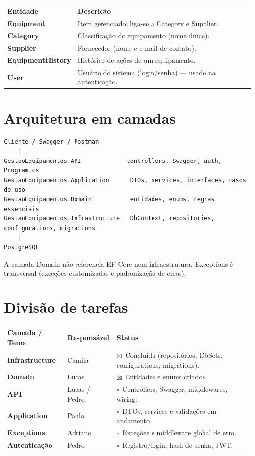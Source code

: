 \documentclass[11pt,a4paper]{article}
\newcommand{\headrow}[1]{\rowcolor{boxbg}#1}
\newcommand{\done}{{\color{headgray}$\boxtimes$}}
\newcommand{\todo}{{\color{accent}$\square$}}
\begin{document}
\begin{tabularx}{\textwidth}{@{}l Y@{}}
\toprule
\headrow{\textbf{Entidade} & \textbf{Descrição}} \\
\midrule
\textbf{Equipment} & Item gerenciado; liga-se a Category e Supplier. \\
\textbf{Category} & Classificação do equipamento (nome único). \\
\textbf{Supplier} & Fornecedor (nome e e-mail de contato). \\
\textbf{EquipmentHistory} & Histórico de ações de um equipamento. \\
\textbf{User} & Usuário do sistema (login/senha) --- usado na autenticação. \\
\bottomrule
\end{tabularx}

\section{Arquitetura em camadas}

\begin{Verbatim}[frame=single, framerule=0.5pt, rulecolor=\color{rulegray}, fontsize=\footnotesize]
Cliente / Swagger / Postman
    |
GestaoEquipamentos.API             controllers, Swagger, auth, Program.cs
GestaoEquipamentos.Application      DTOs, services, interfaces, casos de uso
GestaoEquipamentos.Domain           entidades, enums, regras essenciais
GestaoEquipamentos.Infrastructure   DbContext, repositories, configurations, migrations
    |
PostgreSQL
\end{Verbatim}

A camada Domain não referencia EF Core nem infraestrutura. Exceptions é transversal
(exceções customizadas e padronização de erros).

\section{Divisão de tarefas}

\begin{tabularx}{\textwidth}{@{}l l Y@{}}
\toprule
\headrow{\textbf{Camada / Tema} & \textbf{Responsável} & \textbf{Status}} \\
\midrule
\textbf{Infrastructure} & Camila & \done\ Concluída (repositórios, DbSets, configurations, migrations). \\
\textbf{Domain} & Lucas & \done\ Entidades e enums criados. \\
\textbf{API} & Lucas / Pedro & \todo\ Controllers, Swagger, middlewares, wiring. \\
\textbf{Application} & Paulo & \todo\ DTOs, services e validações em andamento. \\
\textbf{Exceptions} & Adriano & \todo\ Exceções e middleware global de erro. \\
\textbf{Autenticação} & Pedro & \todo\ Registro/login, hash de senha, JWT. \\
\bottomrule
\end{tabularx}
\end{document}
